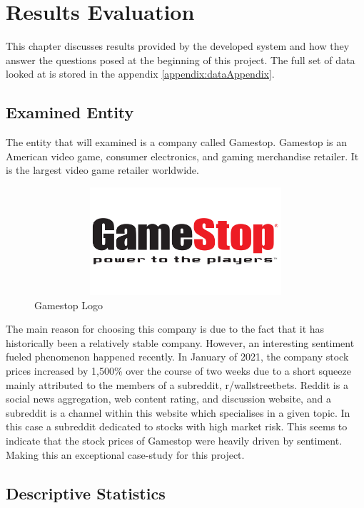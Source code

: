 
\chapter{Results Evaluation}

This chapter discusses results provided by the developed system and how they answer the questions posed at the beginning of this project. The full set of data looked at is stored in the appendix \ref{appendix:dataAppendix}.

\section{Examined Entity}

The entity that will examined is a company called Gamestop. Gamestop is an American video game, consumer electronics, and gaming merchandise retailer. It is the largest video game retailer worldwide.

\begin{figure}[h!]
    \centering
    \includegraphics[width=15cm,height=4cm,keepaspectratio]{resultsEvaluation/gamestop.png}
    \caption{Gamestop Logo}
    \label{fig:gamestop}
\end{figure}

The main reason for choosing this company is due to the fact that it has historically been a relatively stable company. However, an interesting sentiment fueled phenomenon happened recently. In January of 2021, the company stock prices increased by 1,500\% over the course of two weeks due to a short squeeze mainly attributed to the members of a subreddit, r/wallstreetbets. Reddit is a social news aggregation, web content rating, and discussion website, and a subreddit is a channel within this website which specialises in a given topic. In this case a subreddit dedicated to stocks with high market risk. This seems to indicate that the stock prices of Gamestop were heavily driven by sentiment. Making this an exceptional case-study for this project.

\section{Descriptive Statistics}

